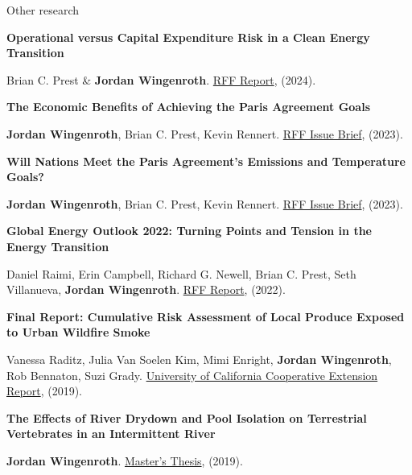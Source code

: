 \documentclass{resume} %
\begin{document}
\begin{rSection}{Other research}

{\bf Operational versus Capital Expenditure Risk in a Clean Energy Transition}
\vspace{-7pt}
\begin{adjustwidth}{12pt}{}
{\small Brian C. Prest \& \textbf{Jordan Wingenroth}. \href{https://www.rff.org/publications/reports/operational-versus-capital-expenditure-risk-in-a-clean-energy-transition/}{RFF Report}, (2024).}
\end{adjustwidth}

{\bf The Economic Benefits of Achieving the Paris Agreement Goals}
\vspace{-7pt}
\begin{adjustwidth}{12pt}{}
{\small \textbf{Jordan Wingenroth}, Brian C. Prest, Kevin Rennert. \href{https://www.rff.org/publications/issue-briefs/the-economic-benefits-of-achieving-the-paris-agreement-goals/}{RFF Issue Brief}, (2023).}
\end{adjustwidth}

{\bf Will Nations Meet the Paris Agreement's Emissions and Temperature Goals?}
\vspace{-7pt}
\begin{adjustwidth}{12pt}{}
{\small \textbf{Jordan Wingenroth}, Brian C. Prest, Kevin Rennert. \href{https://www.rff.org/publications/issue-briefs/will-nations-meet-the-paris-agreements-emissions-and-temperature-goals/}{RFF Issue Brief}, (2023).}
\end{adjustwidth}

{\bf Global Energy Outlook 2022: Turning Points and Tension in the Energy Transition}
\vspace{-7pt}
\begin{adjustwidth}{12pt}{}
{\small Daniel Raimi, Erin Campbell, Richard G. Newell, Brian C. Prest, Seth Villanueva, \textbf{Jordan Wingenroth}. \href{https://www.rff.org/publications/reports/global-energy-outlook-2022/}{RFF Report}, (2022).}
\end{adjustwidth}

\pagebreak

{\bf Final Report: Cumulative Risk Assessment of Local Produce Exposed to Urban Wildfire Smoke}
\vspace{-7pt}
\begin{adjustwidth}{12pt}{}
{\small Vanessa Raditz, Julia Van Soelen Kim, Mimi Enright, \textbf{Jordan Wingenroth}, Rob Bennaton, Suzi Grady. \href{https://ucanr.edu/sites/SoCo/files/308873.pdf}{University of California Cooperative Extension Report}, (2019).}
\end{adjustwidth}

{\bf The Effects of River Drydown and Pool Isolation on Terrestrial Vertebrates in an Intermittent River}
\vspace{-7pt}
\begin{adjustwidth}{12pt}{}
{\small \textbf{Jordan Wingenroth}. \href{https://digicoll.lib.berkeley.edu/record/140194?ln=en}{Master's Thesis}, (2019).}
\end{adjustwidth}

\end{rSection}
\end{document}
